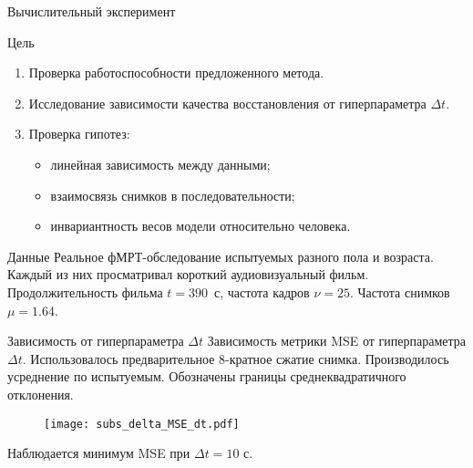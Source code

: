 \documentclass{beamer}
\begin{document}
\begin{frame}{Вычислительный эксперимент}
    \begin{block}{Цель}
        \begin{enumerate}
            \item Проверка работоспособности предложенного метода.
            \item Исследование зависимости качества восстановления от гиперпараметра $\Delta t$.
            \item Проверка гипотез:
                    \begin{itemize}
                        \item линейная зависимость между данными;
                        \item взаимосвязь снимков в последовательности;
                        \item инвариантность весов модели относительно человека.
                    \end{itemize}
        \end{enumerate}
    \end{block}
    \begin{block}{Данные}
        Реальное фМРТ-обследование испытуемых разного пола и возраста.
        Каждый из них просматривал короткий аудиовизуальный фильм.
        Продолжительность фильма $t = 390$~с, частота кадров $\nu = 25$.
        Частота снимков $\mu = 1.64$.
    \end{block}
\end{frame}
\begin{frame}{Зависимость от гиперпараметра $\Delta t$}
    Зависимость метрики MSE от гиперпараметра $\Delta t$.
    Использовалось предварительное 8-кратное сжатие снимка.
    Производилось усреднение по испытуемым.
	Обозначены границы среднеквадратичного отклонения.
    \begin{figure}[h!]
		\centering
		\texttt{[image: subs\_delta\_MSE\_dt.pdf]}
		\label{fig:3}
	\end{figure}
    Наблюдается минимум MSE при $\Delta t = 10 \text{ с}$.
\end{frame}
\end{document}
